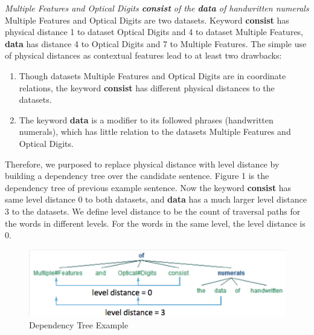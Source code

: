 \documentclass[11pt]{article}
\begin{document}
\textit{Multiple Features and Optical Digits \textbf{consist} of the \textbf{data} of handwritten numerals} \\

Multiple Features and Optical Digits are two datasets. Keyword \textbf{consist} has physical distance 1 to dataset Optical Digits and 4 to dataset Multiple Features, \textbf{data} has distance 4 to Optical Digits and 7 to Multiple Features. The simple use of physical distances as contextual features lead to at least two drawbacks:
\begin{enumerate}
\item Though datasets Multiple Features and Optical Digits are in coordinate relations, the keyword \textbf{consist} has different physical distances to the datasets.
\item The keyword \textbf{data} is a modifier to its followed phrases (handwritten numerals), which has little relation to the datasets Multiple Features and Optical Digits. 
\end{enumerate}
Therefore, we purposed to replace physical distance with level distance by building a dependency tree over the candidate sentence. Figure 1 is the dependency tree of previous example sentence. Now the keyword \textbf{consist} has same level distance 0 to both datasets, and \textbf{data} has a much larger level distance 3 to the datasets. We define level distance to be the count of traversal paths for the words in different levels. For the words in the same level, the level distance is 0.

\begin{figure}[t]\centering
\includegraphics[width=1.05\linewidth]{figures/level-distance.png}
\caption{Dependency Tree Example}
\vspace{-0.3cm}
\label{fig:view}
\end{figure}
\end{document}
